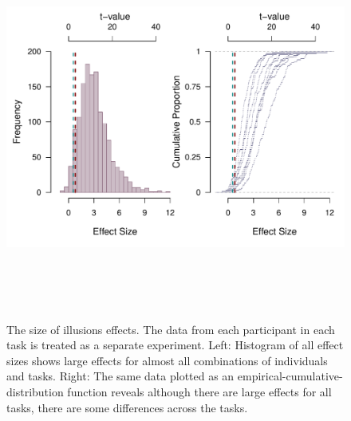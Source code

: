\documentclass[man, 12pt]{apa7} %
\begin{document}
\begin{figure}
    \centering  %
    \includegraphics[width=6in, height=5in]{_figs/effect-plot.pdf}
    \caption{The size of illusions effects. The data from each participant in each task is treated as a separate experiment. Left: Histogram of all effect sizes shows large effects for almost all combinations of individuals and tasks.  Right: The same data plotted as an empirical-cumulative-distribution function reveals although there are large effects for all tasks, there are some differences across the tasks.}
    \label{fig:effectPlots}
\end{figure}
\end{document}
